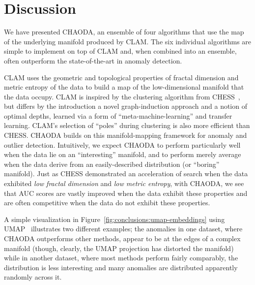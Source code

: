 \section{Discussion}
\label{sec:discussion}

We have presented CHAODA, an ensemble of four algorithms that use the map of the underlying manifold produced by CLAM\@.
The six individual algorithms are simple to implement on top of CLAM and, when combined into an ensemble, often outperform the state-of-the-art in anomaly detection.

CLAM uses the geometric and topological properties of fractal dimension and metric entropy of the data to build a map of the low-dimensional manifold that the data occupy.
CLAM is inspired by the clustering algorithm from CHESS~\cite{ishaq2019clustered}, but differs by the introduction a novel graph-induction approach and a notion of optimal depths, learned via a form of ``meta-machine-learning'' and transfer learning.
CLAM's selection of ``poles'' during clustering is also more efficient than CHESS.
CHAODA builds on this manifold-mapping framework for anomaly and outlier detection.
Intuitively, we expect CHAODA to perform particularly well when the data lie on an ``interesting'' manifold, and to perform merely average when the data derive from an easily-described distribution (or ``boring'' manifold).
Just as CHESS demonstrated an acceleration of search when the data exhibited \emph{low fractal dimension} and \emph{low metric entropy}, with CHAODA, we see that AUC scores are vastly improved when the data exhibit these properties and are often competitive when the data do not exhibit these properties.


A simple visualization in Figure~\ref{fig:conclusions:umap-embeddings} using UMAP~\cite{mcinnes2018umap} illustrates two different examples; the anomalies in one dataset, where CHAODA outperforms other methods, appear to be at the edges of a complex manifold (though, clearly, the UMAP projection has distorted the manifold) while in another dataset, where most methods perform fairly comparably, the distribution is less interesting and many anomalies are distributed apparently randomly across it.

